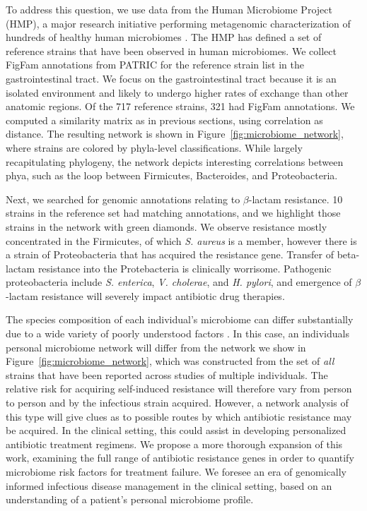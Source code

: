 To address this question, we use data from the Human Microbiome Project (HMP), a major research initiative performing metagenomic characterization of hundreds of healthy human microbiomes \cite{Consortium:2012bm}.
The HMP has defined a set of reference strains that have been observed in human microbiomes.
We collect FigFam annotations from PATRIC for the reference strain list in the gastrointestinal tract.
We focus on the gastrointestinal tract because it is an isolated environment and likely to undergo higher rates of exchange than other anatomic regions.
Of the 717 reference strains, 321 had FigFam annotations.
We computed a similarity matrix as in previous sections, using correlation as distance.
The resulting network is shown in Figure~\ref{fig:microbiome_network}, where strains are colored by phyla-level classifications.
While largely recapitulating phylogeny, the network depicts interesting correlations between phya, such as the loop between Firmicutes, Bacteroides, and Proteobacteria.

Next, we searched for genomic annotations relating to $\beta$-lactam resistance.
10 strains in the reference set had matching annotations, and we highlight those strains in the network with green diamonds.
We observe resistance mostly concentrated in the Firmicutes, of which \emph{S. aureus} is a member, however there is a strain of Proteobacteria that has acquired the resistance gene.
Transfer of beta-lactam resistance into the Protebacteria is clinically worrisome.
Pathogenic proteobacteria include \emph{S. enterica}, \emph{V. cholerae}, and \emph{H. pylori}, and emergence of $\beta$-lactam resistance will severely impact antibiotic drug therapies.

The species composition of each individual's microbiome can differ substantially due to a wide variety of poorly understood factors \cite{Consortium:2012bm}.
In this case, an individuals personal microbiome network will differ from the network we show in Figure~\ref{fig:microbiome_network}, which was constructed from the set of \emph{all} strains that have been reported across studies of multiple individuals.
The relative risk for acquiring self-induced resistance will therefore vary from person to person and by the infectious strain acquired.
However, a network analysis of this type will give clues as to possible routes by which antibiotic resistance may be acquired.
In the clinical setting, this could assist in developing personalized antibiotic treatment regimens.
We propose a more thorough expansion of this work, examining the full range of antibiotic resistance genes in order to quantify microbiome risk factors for treatment failure.
We foresee an era of genomically informed infectious disease management in the clinical setting, based on an understanding of a patient's personal microbiome profile.

